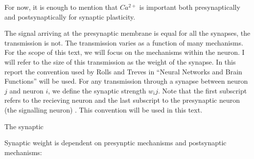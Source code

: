 













For now, it is enough to mention that  $Ca^{2+}$ is important both presynaptically and postsynaptically for synaptic plasticity.












The signal arriving at the presynaptic membrane is equal for all the synapses, the transmission is not. 
The transmission varies as a function of many mechanisms. %
For the scope of this text, we will focus on the mechanisms within the neuron. 
I will refer to the size of this transmission as the weight of the synapse. 
In this report the convention used by Rolls and Treves in ``Neural Networks and Brain Functions'' will be used. 
For any transmission through a synapse between neuron $j$ and neuron $i$, we define the synaptic strength $w_ij$. 
Note that the first subscript refers to the recieving neuron and the last subscript to the presynaptic neuron (the signalling neuron) \cite{TrevesNeuralNetworks}.
This convention will be used in this text. 

The synaptic 






Synaptic weight is dependent on presynptic mechanisms and postsynaptic mechanisms:


